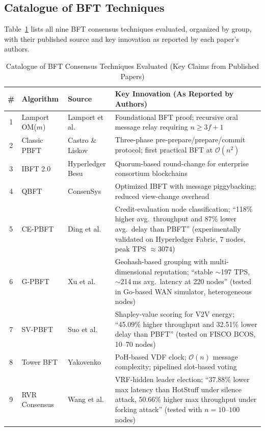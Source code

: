 \documentclass[10pt,twocolumn,letterpaper]{article}
\begin{document}
\subsection{Catalogue of BFT Techniques}
\label{sec:catalogue}

Table~\ref{tab:catalogue} lists all nine BFT consensus techniques evaluated, organized by group, with their published source and key innovation as reported by each paper's authors.

\begin{table}[t]
\caption{Catalogue of BFT Consensus Techniques Evaluated (Key Claims from Published Papers)}
\label{tab:catalogue}
\centering
\scriptsize
\begin{tabular}{@{}cllp{7cm}@{}}
\toprule
\textbf{\#} & \textbf{Algorithm} & \textbf{Source} & \textbf{Key Innovation (As Reported by Authors)} \\
\midrule
1 & Lamport OM($m$) & Lamport et al.~\cite{lamport1982} & Foundational BFT proof; recursive oral message relay requiring $n \geq 3f+1$ \\
2 & Classic PBFT & Castro \& Liskov~\cite{castro1999} & Three-phase pre-prepare/prepare/commit protocol; first practical BFT at $\mathcal{O}(n^2)$ \\
3 & IBFT 2.0 & Hyperledger Besu & Quorum-based round-change for enterprise consortium blockchains \\
4 & QBFT & ConsenSys~\cite{li2020} & Optimized IBFT with message piggybacking; reduced view-change overhead \\
5 & CE-PBFT & Ding et al.~\cite{ding2024} & Credit-evaluation node classification; ``118\% higher avg.\ throughput and 87\% lower avg.\ delay than PBFT'' (experimentally validated on Hyperledger Fabric, 7 nodes, peak TPS $\approx 3074$) \\
6 & G-PBFT & Xu et al.~\cite{xu2025} & Geohash-based grouping with multi-dimensional reputation; ``stable $\sim$197 TPS, $\sim$214\,ms avg.\ latency at 220 nodes'' (tested in Go-based WAN simulator, heterogeneous nodes) \\
7 & SV-PBFT & Suo et al.~\cite{suo2025} & Shapley-value scoring for V2V energy; ``45.09\% higher throughput and 32.51\% lower delay than PBFT'' (tested on FISCO BCOS, 10--70 nodes) \\
8 & Tower BFT & Yakovenko~\cite{yakovenko2018} & PoH-based VDF clock; $\mathcal{O}(n)$ message complexity; pipelined slot-based voting \\
9 & RVR Consensus & Wang et al.~\cite{wang2025} & VRF-hidden leader election; ``37.88\% lower max latency than HotStuff under silence attack, 50.66\% higher max throughput under forking attack'' (tested with $n = 10$--$100$ nodes) \\
\bottomrule
\end{tabular}
\end{table}
\end{document}
